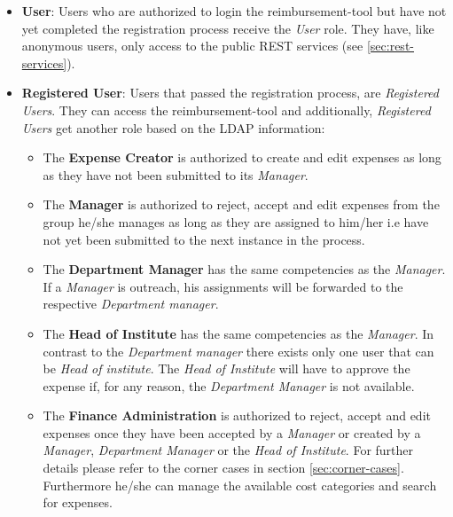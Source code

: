 \begin{itemize}
	\item \textbf{User}: Users who are authorized to login the reimbursement-tool but have not yet completed the registration process receive the \textit{User} role. They have, like anonymous users, only access to the public REST services (see \ref{sec:rest-services}).
	
	\item \textbf{Registered User}: Users that passed the registration process, are \textit{Registered Users}. They can access the reimbursement-tool and additionally, \textit{Registered Users} get another role based on the LDAP information:
	
	\begin{itemize}
		\item The \textbf{Expense Creator} is authorized to create and edit expenses as long as they have not been submitted to its \textit{Manager}.
		
		\item The \textbf{Manager} is authorized to reject, accept and edit expenses from the group he/she manages as long as they are assigned to him/her i.e have not yet been submitted to the next instance in the process.
		
		\item The \textbf{Department Manager} has the same competencies as the \textit{Manager}. If a \textit{Manager} is outreach, his assignments will be forwarded to the respective \textit{Department manager}.
		
		\item The \textbf{Head of Institute} has the same competencies as the \textit{Manager}. In contrast to the \textit{Department manager} there exists only one user that can be \textit{Head of institute}. The \textit{Head of Institute} will have to approve the expense if, for any reason, the \textit{Department Manager} is not available.
		
		\item The \textbf{Finance Administration} is authorized to reject, accept and edit expenses once they have been accepted by a \textit{Manager} or created by a \textit{Manager}, \textit{Department Manager} or the \textit{Head of Institute}. For further details please refer to the corner cases in section \ref{sec:corner-cases}. Furthermore he/she can manage the available cost categories and search for expenses.
	\end{itemize}
\end{itemize}
